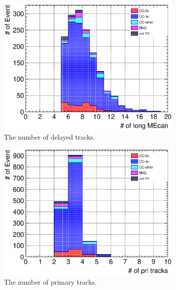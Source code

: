 \begin{figure}
  \begin{subfigure}{\dbfigwid\textwidth}
       \includegraphics[width=\textwidth]{figures/sel/SFGmu_nsdptrk_stack_al9.eps}
       \caption{The number of delayed tracks.}
       \label{subfig:tlpi-trknum-delayed-sfgmu-cut}
  \end{subfigure}
  \begin{subfigure}{\dbfigwid\textwidth}
       \includegraphics[width=\textwidth]{figures/sel/SFGmu_npri_stack_al9.eps}
       \caption{The number of primary tracks.}
       \label{subfig:tlpi-trknum-pri-sfgmu-cut}
  \end{subfigure}
  \\
  \begin{subfigure}{\dbfigwid\textwidth}

\end{subfigure}
\end{figure}

